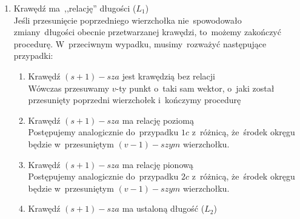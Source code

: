 \documentclass[11pt, a4paper]{article}
\begin{document}
\begin{enumerate}
\begin{enumerate}
     
    \end{enumerate}
     \item Krawędź ma~,,relację'' długości ($L_1$) \\
     Jeśli przesunięcie poprzedniego wierzchołka nie~spowodowało zmiany~długości obecnie przetwarzanej krawędzi,
     to~możemy zakończyć procedurę. W~przeciwnym wypadku, musimy~rozważyć następujące przypadki: 
     \begin{enumerate}
      \item Krawędź $(s+1)-sza$ jest krawędzią bez relacji \\
	Wówczas przesuwamy $v$-ty punkt o~taki sam wektor, o~jaki został przesunięty poprzedni wierzchołek i~kończymy procedurę
      \item Krawędź $(s+1)-sza$ ma relację poziomą \\
       Postępujemy analogicznie do~przypadku \hyperlink{HorLen}{$1c$} z~różnicą, że~środek okręgu będzie w~przesuniętym $(v-1)-szym$ wierzchołku.
      \item Krawędź $(s+1)-sza$ ma relację pionową \\
       Postępujemy analogicznie do~przypadku \hyperlink{VerLen}{$2c$} z~różnicą, że~środek okręgu będzie w~przesuniętym $(v-1)-szym$ wierzchołku.
      \item Krawędź $(s+1)-sza$ ma ustaloną długość ($L_2$) \\
\end{enumerate}
\end{enumerate}
\end{document}
